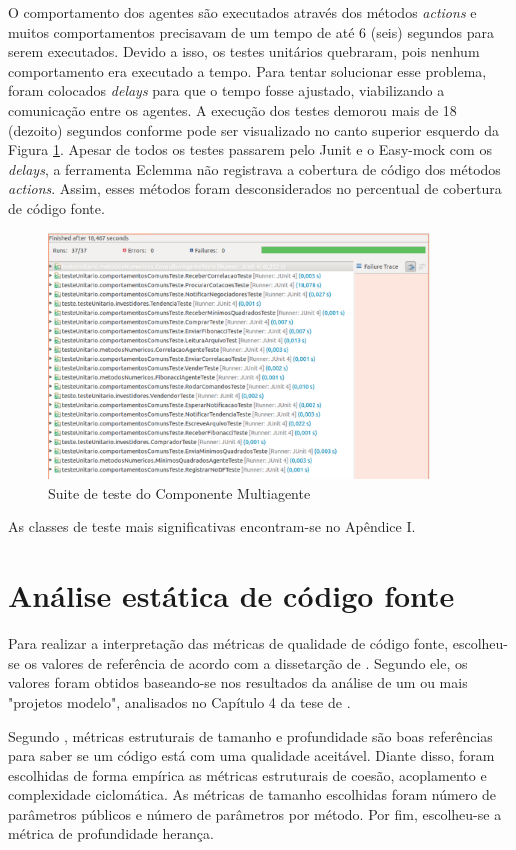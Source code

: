 O comportamento dos agentes são executados através dos métodos \textit{actions} e muitos  comportamentos precisavam de um tempo de até 6 (seis) segundos para serem executados. Devido a isso, os testes unitários quebraram, pois nenhum comportamento era executado a tempo. Para tentar solucionar esse problema, foram colocados \textit{delays} para que o tempo fosse ajustado, viabilizando a comunicação entre os agentes. A execução dos testes demorou mais de 18 (dezoito) segundos conforme pode ser visualizado no  canto superior esquerdo da Figura \ref{eclemmaTodasClasses}. Apesar de todos os testes passarem pelo Junit e o Easy-mock com os \textit{delays}, a ferramenta Eclemma não registrava a cobertura de código dos métodos \textit{actions}. Assim, esses métodos foram desconsiderados no percentual de cobertura de código fonte.

\begin{figure}[H]
\centering
\includegraphics[width=0.9\textwidth]{figuras/eclemmaTodasClasses}
\caption{Suite de teste do Componente Multiagente}
\label{eclemmaTodasClasses}
\end{figure}

As classes de teste mais significativas encontram-se no Apêndice I.

\section{Análise estática de código fonte}
Para realizar a interpretação das métricas de qualidade de código fonte, escolheu-se os valores de referência de acordo com a dissetarção de \cite{filho}. Segundo ele, os valores foram obtidos baseando-se nos resultados da análise de um ou mais "projetos
modelo", analisados no Capítulo 4 da tese de \cite{meirelles2013}.

Segundo \cite{braga2012}, métricas estruturais de tamanho e profundidade são boas referências para saber se um código está com uma qualidade aceitável. Diante disso, foram escolhidas de forma empírica as métricas estruturais de coesão, acoplamento e complexidade ciclomática. As métricas de tamanho escolhidas foram número de parâmetros públicos e número de parâmetros por método. Por fim, escolheu-se a métrica de profundidade herança.

